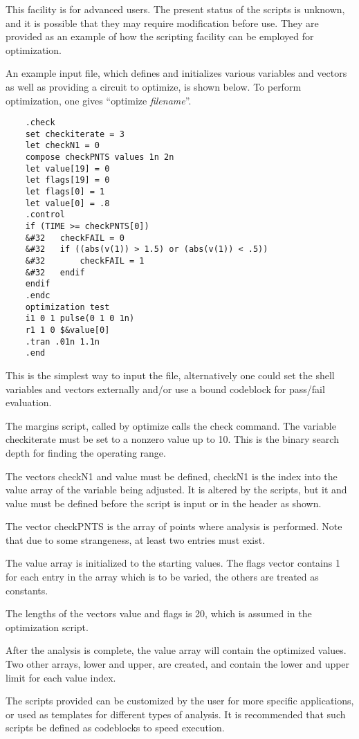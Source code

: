 This facility is for advanced users.  The present status of the
scripts is unknown, and it is possible that they may require
modification before use.  They are provided as an example of how the
{\WRspice} scripting facility can be employed for optimization.

An example input file, which defines and initializes various variables
and vectors as well as providing a circuit to optimize, is shown
below.  To perform optimization, one gives ``{\vt optimize} {\it
filename}''.

\begin{verbatim}
    .check
    set checkiterate = 3
    let checkN1 = 0
    compose checkPNTS values 1n 2n
    let value[19] = 0
    let flags[19] = 0
    let flags[0] = 1
    let value[0] = .8
    .control
    if (TIME >= checkPNTS[0])
    &#32   checkFAIL = 0
    &#32   if ((abs(v(1)) > 1.5) or (abs(v(1)) < .5))
    &#32       checkFAIL = 1
    &#32   endif
    endif
    .endc
    optimization test
    i1 0 1 pulse(0 1 0 1n)
    r1 1 0 $&value[0]
    .tran .01n 1.1n
    .end
\end{verbatim}

This is the simplest way to input the file, alternatively one could
set the shell variables and vectors externally and/or use a bound
codeblock for pass/fail evaluation.

The {\vt margins} script, called by {\vt optimize} calls the {\et
check} command.  The variable {\vt checkiterate} must be set to a
nonzero value up to 10.  This is the binary search depth for finding
the operating range.

The vectors {\et checkN1} and {\et value} must be defined, {\et
checkN1} is the index into the value array of the variable being
adjusted.  It is altered by the scripts, but it and {\et value} must
be defined before the script is input or in the header as shown.

The vector {\et checkPNTS} is the array of points where analysis is
performed.  Note that due to some strangeness, at least two entries
must exist.

The {\et value} array is initialized to the starting values.  The {\et
flags} vector contains 1 for each entry in the array which is to be
varied, the others are treated as constants.

The lengths of the vectors {\et value} and {\et flags} is 20, which is
assumed in the optimization script.

After the analysis is complete, the {\et value} array will contain the
optimized values.  Two other arrays, {\et lower} and {\et upper}, are
created, and contain the lower and upper limit for each value index.

The scripts provided can be customized by the user for more specific
applications, or used as templates for different types of analysis. 
It is recommended that such scripts be defined as codeblocks to speed
execution.

